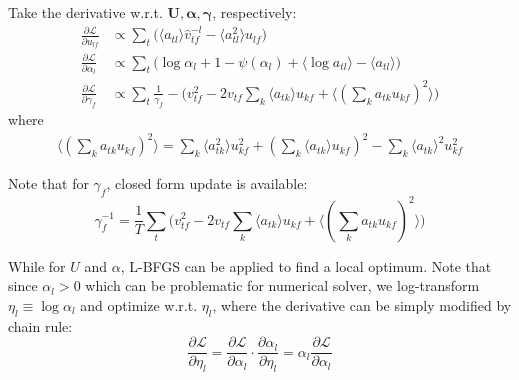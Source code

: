 \documentclass{article}
\begin{document}
Take the derivative w.r.t. $\mathbf{U}, \bm{\alpha}, \bm{\gamma}$, respectively:
\begin{align*}
\frac{\partial \mathcal{L}}{\partial u_{lf}} &\propto \sum_t \biggl( \langle a_{tl} \rangle \hat{v}_{tf}^{-l} - \langle a_{tl}^2 \rangle u_{lf} \biggl)\\
\frac{\partial \mathcal{L}}{\partial \alpha_l} &\propto  \sum_t \biggl( \log \alpha_l + 1 - \psi(\alpha_l) + \langle \log a_{tl} \rangle - \langle a_{tl} \rangle \biggl)\\
\frac{\partial \mathcal{L}}{\partial \gamma_f} &\propto \sum_t \frac{1}{\gamma_f} -  \biggl(v_{tf}^2 - 2 v_{tf}  \sum_k \langle a_{tk} \rangle u_{kf} +  \langle (\sum_k a_{tk} u_{kf})^2 \rangle \biggl)
\end{align*}
where
\begin{align*}
\langle (\sum_k a_{tk} u_{kf})^2 \rangle = \sum_k \langle a_{tk}^2 \rangle u_{kf}^2 + (\sum_k \langle a_{tk} \rangle u_{kf})^2 - \sum_k \langle a_{tk}\rangle ^2 u_{kf}^2
\end{align*}

Note that for $\gamma_f$, closed form update is available:
\begin{equation*}
\gamma_f^{-1} = \frac{1}{T}\sum_t \biggl(v_{tf}^2 - 2 v_{tf}  \sum_k \langle a_{tk} \rangle u_{kf} +  \langle (\sum_k a_{tk} u_{kf})^2 \rangle \biggl)
\end{equation*}

While for $U$ and $\alpha$, L-BFGS can be applied to find a local optimum. Note that since $\alpha_l > 0$ which can be problematic for numerical solver, we log-transform $\eta_l \equiv \log \alpha_l$ and optimize w.r.t. $\eta_l$, where the derivative can be simply modified by chain rule:
\[
\frac{\partial \mathcal{L}}{\partial \eta_l} = \frac{\partial \mathcal{L}}{\partial \alpha_l} \cdot \frac{\partial \alpha_l}{\partial \eta_l} = \alpha_l \frac{\partial \mathcal{L}}{\partial \alpha_l} 
\]
\end{document}
